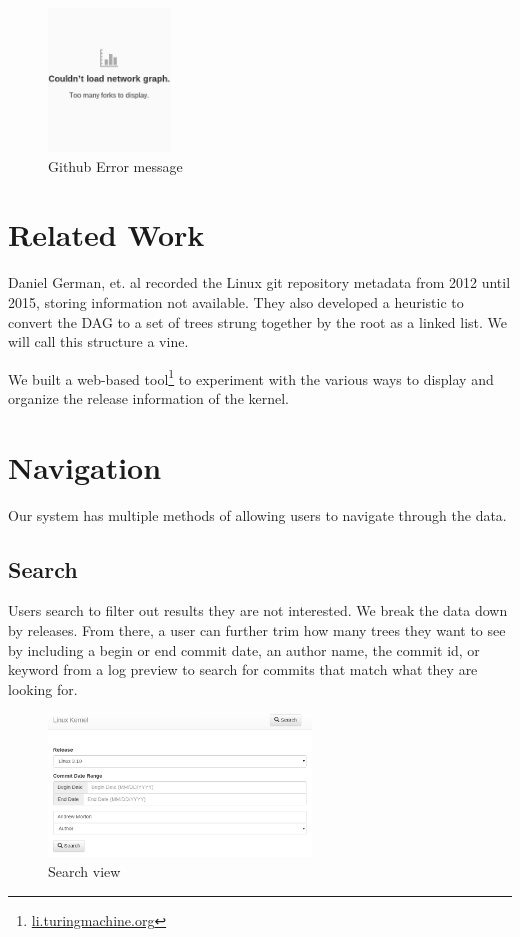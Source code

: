 \documentclass[conference, draftclsnofoot]{IEEEtran}
\begin{document}
\begin{figure}[h]
	\centering
	\includegraphics[height=1.5in]{figures/github_viewer.png}
	\caption{Github Error message}
	\label{fig:github dag}
\end{figure}


\section{Related Work}
Daniel German, et. al  recorded the Linux git repository
metadata from 2012 until 2015, storing information not available. They
also developed a heuristic to convert the DAG to a set of trees strung together
by the root as a linked list. We will call this structure a vine.


We built a web-based tool\footnote{\url{li.turingmachine.org}} to experiment
with the various ways to display and organize the release information of the
kernel.

\section{Navigation}

Our system has multiple methods of allowing users to navigate through the data.

\subsection{Search}

Users search to filter out results they are not interested. We break the data
down by releases. From there, a user can further trim how many trees they want
to see by including a begin or end commit date, an author name, the commit id,
or keyword from a log preview to search for commits that match what they are
looking for.

\begin{figure}[h]
	\centering
	\includegraphics[height=1.5in]{figures/search_view.png}
	\caption{Search view}
	\label{fig:search_view}
\end{figure}
\end{document}
